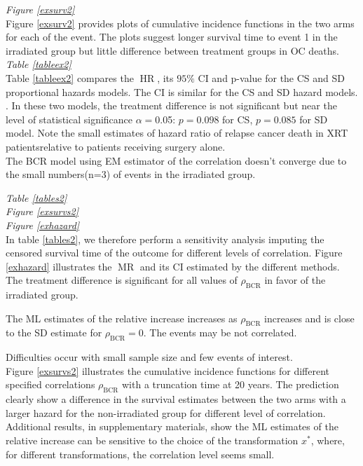 \documentclass[twoside,a4paper,12pt]{article}
\def\HR{\operatorname{HR}}
\def\MR{\operatorname{MR}}
\def\BCR{\operatorname{BCR}}
\theoremstyle{plain}
\theoremstyle{definition}
\begin{document}
\noindent \textit{Figure \ref{exsurv2}}\\
  
  Figure \ref{exsurv2} provides  plots of cumulative incidence functions in the 
two arms for each of the event. 
The plots suggest longer survival time to event 1 in the irradiated group but 
little difference between treatment groups in OC deaths.
\\
  
    
 
 \noindent \textit{Table \ref{tableex2}}\\
 
 Table \ref{tableex2} compares the $\HR$, its $95\%$ CI and p-value for the CS 
and SD proportional hazards models. 
The CI is similar  for the CS and SD hazard models. 
. 
In these two models, the treatment difference is not significant but near the level of statistical significance $\alpha=$0.05: $p=0.098$ for CS, $p=0.085$ for SD 
model.
Note the small estimates of hazard ratio of relapse cancer death 
in XRT patientsrelative to patients receiving surgery alone. 
\\


The BCR model  using EM estimator of the correlation doesn't converge due to the 
small numbers(n=3) of events in the irradiated group. 

\noindent \textit{Table \ref{tables2}}\\
\noindent \textit{Figure \ref{exsurvs2}}\\   
\noindent \textit{Figure \ref{exhazard}}\\  

In table \ref{tables2}, we therefore perform a sensitivity analysis imputing the censored 
survival time of the outcome for different levels of correlation. 
Figure \ref{exhazard} illustrates the $\MR$ and its CI estimated by the different 
methods. 
The treatment difference is significant for all values of $\rho_{\BCR}$ in favor 
of the irradiated group. 

The ML estimates of the relative increase increases as $\rho_{\BCR}$ increases 
and is close to the SD estimate for $\rho_{\BCR}=0$. 
The events may be not correlated. 

Difficulties occur with small sample size and few events of interest.\\ 

Figure \ref{exsurvs2} illustrates the cumulative incidence functions for 
different specified correlations $\rho_{\BCR}$ with a truncation time at 20 
years. 
The prediction clearly show a difference in the survival estimates between the 
two arms with a larger hazard for the non-irradiated group for different level 
of correlation. 
Additional results, in supplementary materials, show the ML estimates of the 
relative increase can be sensitive to the choice of the transformation $x^*$, 
where, for different transformations, the correlation level seems small.\\
     
\end{document}
